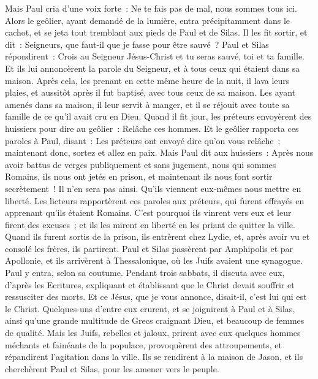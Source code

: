 \begin{multicols}{2}
Mais Paul cria d'une voix forte~: Ne te fais pas de mal, nous sommes tous ici.
Alors le geôlier, ayant demandé de la lumière, entra précipitamment dans le cachot, et se jeta tout tremblant aux pieds de Paul et de Silas.
Il les fit sortir, et dit~: Seigneurs, que faut-il que je fasse pour être sauvé~?
Paul et Silas répondirent~: Crois au Seigneur Jésus-Christ et tu seras sauvé, toi et ta famille.
Et ils lui annoncèrent la parole du Seigneur, et à tous ceux qui étaient dans sa maison.
Après cela, les prenant en cette même heure de la nuit, il lava leurs plaies, et aussitôt après il fut baptisé, avec tous ceux de sa maison.
Les ayant amenés dans sa maison, il leur servit à manger, et il se réjouit avec toute sa famille de ce qu'il avait cru en Dieu.
Quand il fit jour, les préteurs envoyèrent des huissiers pour dire au geôlier~: Relâche ces hommes.
Et le geôlier rapporta ces paroles à Paul, disant~: Les préteurs ont envoyé dire qu'on vous relâche~; maintenant donc, sortez et allez en paix.
Mais Paul dit aux huissiers~: Après nous avoir battus de verges publiquement et sans jugement, nous qui sommes Romains, ils nous ont jetés en prison, et maintenant ils nous font sortir secrètement~! Il n'en sera pas ainsi. Qu'ils viennent eux-mêmes nous mettre en liberté.
Les licteurs rapportèrent ces paroles aux préteurs, qui furent effrayés en apprenant qu'ils étaient Romains.
C'est pourquoi ils vinrent vers eux et leur firent des excuses~; et ils les mirent en liberté en les priant de quitter la ville.
Quand ils furent sortis de la prison, ils entrèrent chez Lydie, et, après avoir vu et consolé les frères, ils partirent.
\VerseOne{}Paul et Silas passèrent par Amphipolis et par Apollonie, et ils arrivèrent à Thessalonique, où les Juifs avaient une synagogue.
Paul y entra, selon sa coutume. Pendant trois sabbats, il discuta avec eux, d'après les Ecritures,
expliquant et établissant que le Christ devait souffrir et ressusciter des morts. Et ce Jésus, que je vous annonce, disait-il, c'est lui qui est le Christ.
Quelques-uns d'entre eux crurent, et se joignirent à Paul et à Silas, ainsi qu'une grande multitude de Grecs craignant Dieu, et beaucoup de femmes de qualité.
Mais les Juifs, rebelles et jaloux, prirent avec eux quelques hommes méchants et fainéants de la populace, provoquèrent des attroupements, et répandirent l'agitation dans la ville. Ils se rendirent à la maison de Jason, et ils cherchèrent Paul et Silas, pour les amener vers le peuple.

\end{multicols}
